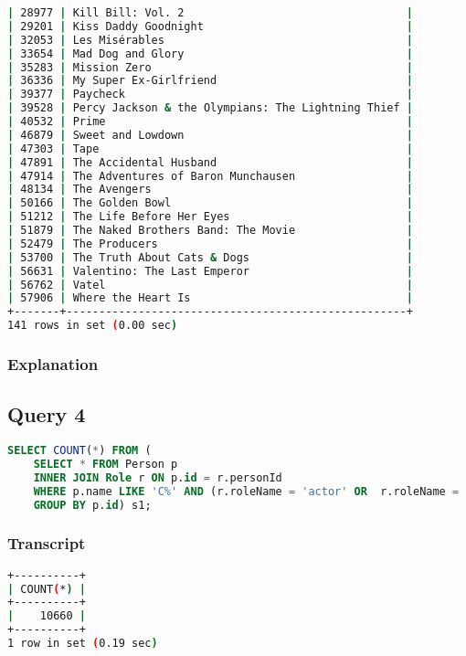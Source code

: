 \begin{lstlisting}[language=bash]
| 28977 | Kill Bill: Vol. 2                                  |
| 29201 | Kiss Daddy Goodnight                               |
| 32053 | Les Misérables                                     |
| 33654 | Mad Dog and Glory                                  |
| 35283 | Mission Zero                                       |
| 36336 | My Super Ex-Girlfriend                             |
| 39377 | Paycheck                                           |
| 39528 | Percy Jackson & the Olympians: The Lightning Thief |
| 40532 | Prime                                              |
| 46879 | Sweet and Lowdown                                  |
| 47303 | Tape                                               |
| 47891 | The Accidental Husband                             |
| 47914 | The Adventures of Baron Munchausen                 |
| 48134 | The Avengers                                       |
| 50166 | The Golden Bowl                                    |
| 51212 | The Life Before Her Eyes                           |
| 51879 | The Naked Brothers Band: The Movie                 |
| 52479 | The Producers                                      |
| 53700 | The Truth About Cats & Dogs                        |
| 56631 | Valentino: The Last Emperor                        |
| 56762 | Vatel                                              |
| 57906 | Where the Heart Is                                 |
+-------+----------------------------------------------------+
141 rows in set (0.00 sec)
\end{lstlisting}

\subsubsection{Explanation}


\subsection{Query 4}
\begin{lstlisting}[language=sql]
SELECT COUNT(*) FROM (
	SELECT * FROM Person p
	INNER JOIN Role r ON p.id = r.personId
	WHERE p.name LIKE 'C%' AND (r.roleName = 'actor' OR  r.roleName = 'director')
	GROUP BY p.id) s1;
\end{lstlisting}

\subsubsection{Transcript}
\begin{lstlisting}[language=bash]
+----------+
| COUNT(*) |
+----------+
|    10660 |
+----------+
1 row in set (0.19 sec)
\end{lstlisting}


